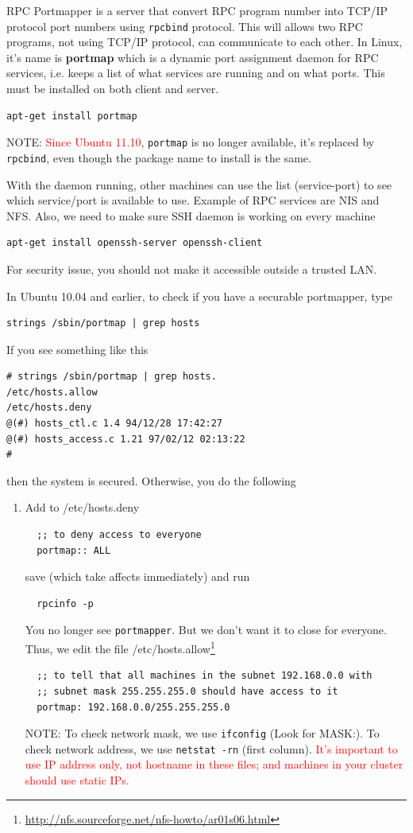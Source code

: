 RPC Portmapper is a server that convert RPC program number into TCP/IP protocol
port numbers using \verb!rpcbind! protocol. This will allows two RPC programs,
not using TCP/IP protocol, can communicate to each other. In Linux, it's name is
{\bf portmap} which is a dynamic port assignment daemon for RPC services, i.e.
keeps a list of what services are running and on what ports.
This must be installed on both client and server.
\begin{verbatim}
apt-get install portmap
\end{verbatim}
NOTE: \textcolor{red}{Since Ubuntu 11.10}, \verb!portmap! is no longer
available, it's replaced by \verb!rpcbind!, even though the package name to
install is the same.

With the daemon running, other machines can use the list (service-port) to see
which service/port is available to use. Example of RPC services are NIS and NFS. 
Also, we need to make sure SSH daemon is working on every machine
\begin{verbatim}
apt-get install openssh-server openssh-client
\end{verbatim}



For security issue, you should not make it accessible outside a trusted LAN.


In Ubuntu 10.04 and earlier, to check if you have a securable portmapper, type
\begin{verbatim}
strings /sbin/portmap | grep hosts
\end{verbatim}
If you see something like this
\begin{verbatim}
# strings /sbin/portmap | grep hosts.
/etc/hosts.allow
/etc/hosts.deny
@(#) hosts_ctl.c 1.4 94/12/28 17:42:27
@(#) hosts_access.c 1.21 97/02/12 02:13:22
#
\end{verbatim}
then the system is secured. Otherwise, you do the following 
\begin{enumerate}
  \item Add to /etc/hosts.deny
  \begin{verbatim}
  ;; to deny access to everyone
  portmap:: ALL
  \end{verbatim}
  save (which take affects immediately) and run
  \begin{verbatim}
  rpcinfo -p
  \end{verbatim}
  You no longer see \verb!portmapper!. But we don't want it to close for
  everyone. Thus, we edit the file
  /etc/hosts.allow\footnote{\url{http://nfs.sourceforge.net/nfs-howto/ar01s06.html}}
  \begin{verbatim}
  ;; to tell that all machines in the subnet 192.168.0.0 with
  ;; subnet mask 255.255.255.0 should have access to it
  portmap: 192.168.0.0/255.255.255.0
  \end{verbatim}
  NOTE: To check network mask, we use \verb!ifconfig! (Look for MASK:). To check
  network address, we use \verb!netstat -rn! (first column). 
  \textcolor{red}{It's important to use IP address only, not hostname in these
  files; and machines in your cluster should use static IPs.}
  
  
\end{enumerate}

